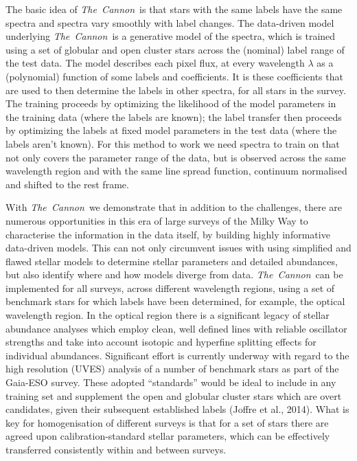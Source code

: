 \documentclass[12pt, preprint]{aastex}
\newcommand{\tc}{\textsl{The~Cannon}}
\begin{document}
The basic idea of \tc\ is that stars with the same labels have the same spectra and spectra vary smoothly with label changes. The data-driven model underlying \tc\ is a generative model of the spectra, which is trained using a set of globular and open cluster stars across the (nominal) label range of the test data. The model describes each pixel flux, at every wavelength $\lambda$ as a (polynomial) function of some labels and coefficients. It is these coefficients that are used to then determine the labels in other spectra, for all stars in the survey. The training proceeds by optimizing the likelihood of the model parameters in the training data (where the labels are known); the label
transfer then proceeds by optimizing the labels at fixed model parameters in the test data (where the labels aren't known). For this method to work we need spectra to train on that not only covers the parameter range of the data, but is observed across the same wavelength region and with the same line spread function, continuum normalised and shifted to the rest frame. 

With \tc\ we demonstrate that in addition to the challenges, there are numerous opportunities in this era of large surveys of the Milky Way to characterise the information in the data itself, by building highly informative data-driven models.  This can not only circumvent issues with using simplified and flawed stellar models to determine stellar parameters and detailed abundances, but also identify where and how models diverge from data. \tc\ can be implemented for all surveys, across different wavelength regions, using a set of benchmark stars for which labels have been determined, for example, the optical wavelength region. In the optical region there is a significant legacy of stellar abundance analyses which employ clean, well defined lines with reliable oscillator strengths and take into account isotopic and hyperfine splitting effects for individual abundances. Significant effort is currently underway with regard to the high resolution (UVES) analysis of a number of benchmark stars as part of the Gaia-ESO survey. These adopted ``standards'' would be ideal to include in any training set and supplement the open and globular cluster stars which are overt candidates, given their subsequent established labels (Joffre et al., 2014). What is key for homogenisation of different surveys is that for a set of stars there are agreed upon calibration-standard stellar parameters, which can be effectively transferred consistently within and between surveys.  
\end{document}
